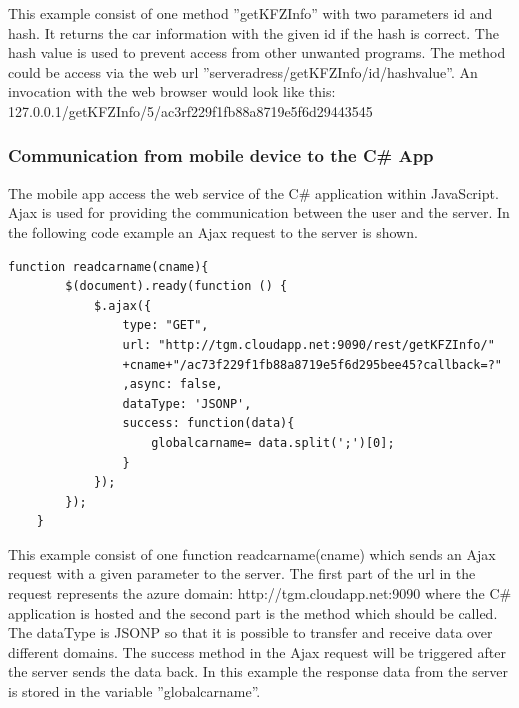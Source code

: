 This example consist of one method ''getKFZInfo'' with two parameters id and hash. It returns the car information with the given id if the hash is correct. The hash value is used to prevent access from other unwanted programs. The method could be access via the web url ''serveradress/getKFZInfo/id/hashvalue''. An invocation with the web browser would look like this:  127.0.0.1/getKFZInfo/5/ac3rf229f1fb88a8719e5f6d29443545
\newpage
\subsubsection{Communication from mobile device to the C\# App}

The mobile app access the web service of the C\# application within JavaScript. Ajax is used for providing the communication between the user and the server. In the following code example an Ajax request to the server is shown.


\begin{lstlisting}[caption=readcarname example]
function readcarname(cname){
        $(document).ready(function () {
            $.ajax({
                type: "GET",
                url: "http://tgm.cloudapp.net:9090/rest/getKFZInfo/"
                +cname+"/ac73f229f1fb88a8719e5f6d295bee45?callback=?"
                ,async: false,
                dataType: 'JSONP',
                success: function(data){
                    globalcarname= data.split(';')[0];
                }
            });
        });
    }
\end{lstlisting}
This example consist of one function readcarname(cname) which sends an Ajax request with a given parameter to the server. The first part of the url in the request represents the azure domain: http://tgm.cloudapp.net:9090 where the C\# application is hosted and the second part is the method which should be called. The dataType is JSONP so that it is possible to transfer and receive data over different domains. The success method in the Ajax request will be triggered after the server sends the data back. In this example the response data from the server is stored in the variable ''globalcarname''.
\newpage
